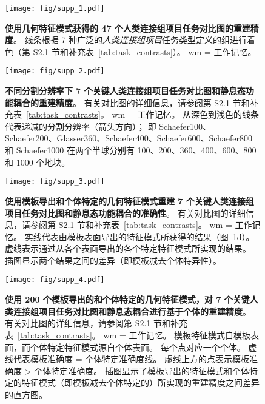 \documentclass[lang=cn,a4paper,newtx,citestyle=gb7714-2015, bibstyle=gb7714-2015]{elegantpaper}
\begin{document}
\begin{figure}[!htb] 
	\centering
	\texttt{[image: fig/supp\_1.pdf]}
	\caption{\textbf{使用几何特征模式获得的 47 个人类连接组项目任务对比图的重建精度}。
		线条根据 7 种广泛的\textit{人类连接组项目}任务类型定义的组进行着色（第 S2.1 节和补充表~\ref{tab:task_contrasts}）。 wm = 工作记忆。} \label{fig:supp_1}
\end{figure}



\begin{figure}[!htb] 
	\centering
	\texttt{[image: fig/supp\_2.pdf]}
	\caption{\textbf{不同分割分辨率下 7 个关键人类连接组项目任务对比图和静息态功能耦合的重建精度}。 
		有关对比图的详细信息，请参阅第 S2.1 节和补充表~\ref{tab:task_contrasts}。
		wm = 工作记忆。
		从深色到浅色的线条代表递减的分割分辨率（箭头方向）；
		即 Schaefer100、Schaefer200、Glasser360、Schaefer400、Schaefer600、Schaefer800 和 Schaefer1000 在两个半球分别有 100、200、360、400、600、800 和 1000 个地块。} \label{fig:supp_2}
\end{figure}



\begin{figure}[!htb] 
	\centering
	\texttt{[image: fig/supp\_3.pdf]}
	\caption{\textbf{使用模板导出和个体特定的几何特征模式重建 7 个关键人类连接组项目任务对比图和静息态功能耦合的准确性}。
		有关对比图的详细信息，请参阅第 S2.1 节和补充表~\ref{tab:task_contrasts}。 
		wm = 工作记忆。
		实线代表由模板表面导出的特征模式所获得的结果（图~\ref{fig:supp_1}d）。
		虚线表示通过从各个表面导出的各个特定特征模式所实现的结果。
		插图显示两个结果之间的差异（即模板减去个体特异性）。} \label{fig:supp_3}
\end{figure}




\begin{figure}[!htb] 
	\centering
	\texttt{[image: fig/supp\_4.pdf]}
	\caption{\textbf{使用 200 个模板导出的和个体特定的几何特征模式，对 7 个关键人类连接组项目任务对比图和静息态耦合进行基于个体的重建精度}。
		有关对比图的详细信息，请参阅第 S2.1 节和补充表~\ref{tab:task_contrasts}。
		wm = 工作记忆。
		模板特征模式自模板表面，而个体特定特征模式源自个体表面。
		每个点对应一个个体。
		虚线代表模板准确度 = 个体特定准确度线。
		虚线上方的点表示模板准确度 > 个体特定准确度。
		插图显示了模板导出的特征模式和个体特定的特征模式（即模板减去个体特定的）所实现的重建精度之间差异的直方图。} \label{fig:supp_4}
\end{figure}
\end{document}
